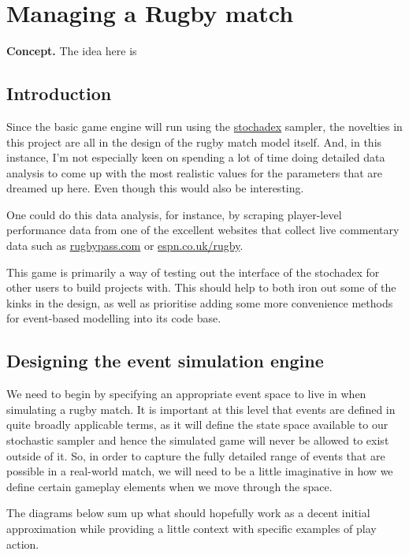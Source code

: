 \documentclass{book}
\begin{document}
\chapter{\sffamily Managing a Rugby match}

{\bfseries\sffamily Concept.} The idea here is 

\section{\sffamily Introduction}

Since the basic game engine will run using the \href{https://github.com/umbralcalc/stochadex}{stochadex} sampler, the novelties in this project are all in the design of the rugby match model itself. And, in this instance, I'm not especially keen on spending a lot of time doing detailed data analysis to come up with the most realistic values for the parameters that are dreamed up here. Even though this would also be interesting.

One could do this data analysis, for instance, by scraping player-level performance data from one of the excellent websites that collect live commentary data such as \href{https://www.rugbypass.com/}{rugbypass.com} or \href{https://www.espn.co.uk/rugby/}{espn.co.uk/rugby}.

This game is primarily a way of testing out the interface of the stochadex for other users to build projects with. This should help to both iron out some of the kinks in the design, as well as prioritise adding some more convenience methods for event-based modelling into its code base.

\section{\sffamily Designing the event simulation engine}

We need to begin by specifying an appropriate event space to live in when simulating a rugby match. It is important at this level that events are defined in quite broadly applicable terms, as it will define the state space available to our stochastic sampler and hence the simulated game will never be allowed to exist outside of it. So, in order to capture the fully detailed range of events that are possible in a real-world match, we will need to be a little imaginative in how we define certain gameplay elements when we move through the space.

The diagrams below sum up what should hopefully work as a decent initial approximation while providing a little context with specific examples of play action.
\end{document}
